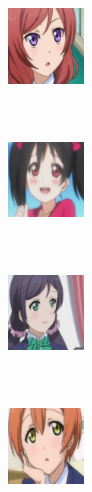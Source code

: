 \documentclass[dvipdfmx,11pt,notheorems]{beamer}
\theoremstyle{definition}
\begin{document}
\begin{frame}
\begin{figure}[t]
\begin{minipage}{0.2\hsize}
  \\
 \end{minipage}
\end{figure}
\begin{figure}[t]
 \begin{minipage}{0.17\hsize}
  \centering
   \\
  \centering
  \includegraphics[width=20mm,bb=0 0 200 200]{./fig/png/faces/maki.png}\\
  \\
 \end{minipage}
 \begin{minipage}{0.17\hsize}
  \centering
   \\
  \centering
  \includegraphics[width=20mm,bb=0 0 200 200]{./fig/png/faces/niko.png}\\
  \\
 \end{minipage}
 \begin{minipage}{0.17\hsize}
  \centering
   \\
  \centering
  \includegraphics[width=20mm,bb=0 0 200 200]{./fig/png/faces/nozomi.png}\\
  \\
 \end{minipage}
 \begin{minipage}{0.17\hsize}
  \centering
   \\
  \centering
  \includegraphics[width=20mm,bb=0 0 200 200]{./fig/png/faces/rin.png} \\

\end{minipage}
\end{figure}
\end{frame}
\end{document}
